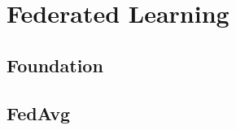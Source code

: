 \chapter{Federated Learning}
\label{ch:Federated_Learning}

\section{Foundation}
\lipsum[1-3]  %

\section{FedAvg}
\lipsum[4-6]  %